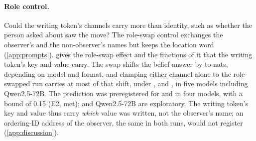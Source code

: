 \begin{table}[!ht]
\centering
\caption{\textbf{Paint and schedule tasks.} Key share under \fmtOpt{} and $\mathrm{ID}_K$ (nats) in each format, clamped from layer~0. $n = 150$ stories per task, format and model; 95\% bootstrap CIs. Preregistration D (D1, D2) for \fmtOpt{}, \fmtNone{} and \fmtBefore{}; the rest exploratory.}
\label{tab:tasks}
\resizebox{\textwidth}{!}{}
\end{table}

\paragraph{Role control.} Could the writing token's channels carry more than identity, such as whether the person asked about saw the move? The role-swap control exchanges the observer's and the non-observer's names but keeps the location word (\cref{app:prompts}).  gives the role-swap effect and the fractions of it that the writing token's key and value carry. The swap shifts the belief answer by \roleEffMin{} to \roleEffMax{} nats, depending on model and format, and clamping either channel alone to the role-swapped run carries at most \roleFracMax{} of that shift, under \fmtOpt{}, \fmtNone{} and \fmtLetter{}, in five models including Qwen2.5-72B. The prediction was preregistered for \fmtOpt{} and \fmtNone{} in four models, with a bound of 0.15 (E2, met); \fmtLetter{} and Qwen2.5-72B are exploratory. The writing token's key and value thus carry \emph{which} value was written, not the observer's name; an ordering-ID address of the observer, the same in both runs, would not register (\cref{app:discussion}).

\begin{table}[!ht]
\centering
\caption{\textbf{Identity, not belief role.} Role effect: mean change in $m = \log p(\text{initial}) - \log p(\textsc{loc})$ when the observer and non-observer are swapped with the same location word (nats). $f_K$, $f_V$: fraction of that change reproduced by clamping only the writing token's key or value (all layers) to the role-swapped run's, as a ratio of means. Direct question; $n = 150$ stories per format and model; 95\% bootstrap CIs. Preregistration E (E2) for \fmtOpt{} and \fmtNone{} in the four 7--14B models; \fmtLetter{} and Qwen2.5-72B exploratory.}
\label{tab:role}

\end{table}

